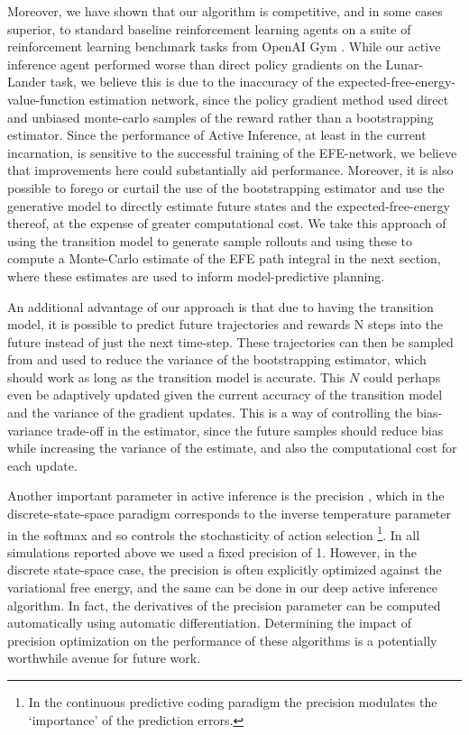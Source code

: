 Moreover, we have shown that our algorithm is competitive, and in some cases superior, to standard baseline reinforcement learning agents on a suite of reinforcement learning benchmark tasks from OpenAI Gym \citep{brockman2016openai}. While our active inference agent performed worse than direct policy gradients on the Lunar-Lander task, we believe this is due to the inaccuracy of the expected-free-energy-value-function estimation network, since the policy gradient method used direct and unbiased monte-carlo samples of the reward rather than a bootstrapping estimator. Since the performance of Active Inference, at least in the current incarnation, is sensitive to the successful training of the EFE-network, we believe that improvements here could substantially aid performance. Moreover, it is also possible to forego or curtail the use of the bootstrapping estimator and use the generative model to directly estimate future states and the expected-free-energy thereof, at the expense of greater computational cost. We take this approach of using the transition model to generate sample rollouts and using these to compute a Monte-Carlo estimate of the EFE path integral in the next section, where these estimates are used to inform model-predictive planning.

An additional advantage of our approach is that due to having the transition model, it is possible to predict future trajectories and rewards N steps into the future instead of just the next time-step. These trajectories can then be sampled from and used to reduce the variance of the bootstrapping estimator, which should work as long as the transition model is accurate. This $N$ could perhaps even be adaptively updated given the current accuracy of the transition model and the variance of the gradient updates. This is a way of controlling the bias-variance trade-off in the estimator, since the future samples should reduce bias while increasing the variance of the estimate, and also the computational cost for each update. 
\newline

Another important parameter in active inference is the precision \citep*{feldman2010attention,kanai2015cerebral}, which in the discrete-state-space paradigm corresponds to the inverse temperature parameter in the softmax and so controls the stochasticity of action selection \footnote{In the continuous predictive coding paradigm the precision modulates the `importance' of the prediction errors.}. In all simulations reported above we used a fixed precision of 1. However, in the discrete state-space case, the precision is often explicitly optimized against the variational free energy, and the same can be done in our deep active inference algorithm. In fact, the derivatives of the precision parameter can be computed automatically using automatic differentiation. Determining the impact of precision optimization on the performance of these algorithms is a potentially worthwhile avenue for future work. 

